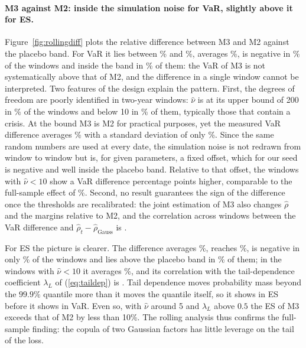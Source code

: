 \paragraph{M3 against M2: inside the simulation noise for VaR, slightly above it for ES.}
Figure~\ref{fig:rollingdiff} plots the relative difference between M3 and M2 against the placebo band. For VaR it lies between \% and \%, averages \%, is negative in \% of the windows and inside the band in \% of them: the VaR of M3 is not systematically above that of M2, and the difference in a single window cannot be interpreted. Two features of the design explain the pattern. First, the degrees of freedom are poorly identified in two-year windows: $\hat\nu$ is at its upper bound of 200 in \% of the windows and below 10 in \% of them, typically those that contain a crisis. At the bound M3 is M2 for practical purposes, yet the measured VaR difference averages \% with a standard deviation of only \%. Since the same random numbers are used at every date, the simulation noise is not redrawn from window to window but is, for given parameters, a fixed offset, which for our seed is negative and well inside the placebo band. Relative to that offset, the windows with $\hat\nu<10$ show a VaR difference  percentage points higher, comparable to the full-sample effect of \%. Second, no result guarantees the sign of the difference once the thresholds are recalibrated: the joint estimation of M3 also changes $\hat\rho$ and the margins relative to M2, and the correlation across windows between the VaR difference and $\hat\rho_{t}-\hat\rho_{\mathrm{Gauss}}$ is .

For ES the picture is clearer. The difference averages \%, reaches \%, is negative in only \% of the windows and lies above the placebo band in \% of them; in the windows with $\hat\nu<10$ it averages \%, and its correlation with the tail-dependence coefficient $\lambda_L$ of (\ref{eq:taildep}) is . Tail dependence moves probability mass beyond the $99.9\%$ quantile more than it moves the quantile itself, so it shows in ES before it shows in VaR. Even so, with $\hat\nu$ around 5 and $\lambda_L$ above $0.5$ the ES of M3 exceeds that of M2 by less than 10\%. The rolling analysis thus confirms the full-sample finding: the copula of two Gaussian factors has little leverage on the tail of the loss.

